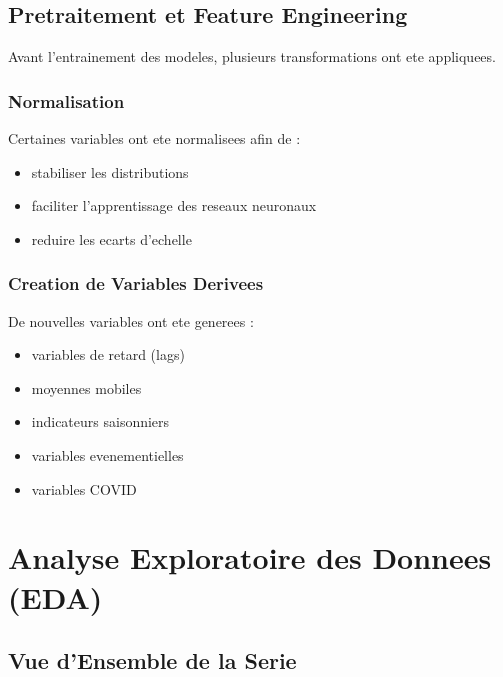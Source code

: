 \documentclass[12pt,a4paper]{report}
\begin{document}
\section{Pretraitement et Feature Engineering}

Avant l'entrainement des modeles, plusieurs transformations ont ete
appliquees.

\subsection{Normalisation}

Certaines variables ont ete normalisees afin de :

\begin{itemize}
    \item stabiliser les distributions
    \item faciliter l'apprentissage des reseaux neuronaux
    \item reduire les ecarts d'echelle
\end{itemize}

\subsection{Creation de Variables Derivees}

De nouvelles variables ont ete generees :

\begin{itemize}
    \item variables de retard (lags)
    \item moyennes mobiles
    \item indicateurs saisonniers
    \item variables evenementielles
    \item variables COVID
\end{itemize}


\chapter{Analyse Exploratoire des Donnees (EDA)}

\section{Vue d'Ensemble de la Serie}
\end{document}
